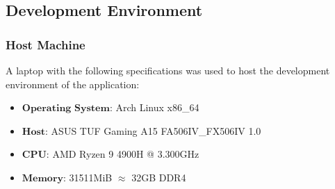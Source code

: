\documentclass[journal]{./IEEE/IEEEtran}
\begin{document}
\subsection{Development Environment}
\subsubsection{\textbf{Host Machine}}
A laptop with the following specifications was used to host the development environment of the application:

\begin{itemize}
    \item $\textbf{Operating System:}$  Arch Linux x86\_64
    \item $\textbf{Host:}$ ASUS TUF Gaming A15 FA506IV\_FX506IV 1.0
    \item $\textbf{CPU:}$ AMD Ryzen 9 4900H @ 3.300GHz
    \item $\textbf{Memory:}$ 31511MiB $\approx$ 32GB DDR4
\end{itemize} \hfill \
\end{document}

